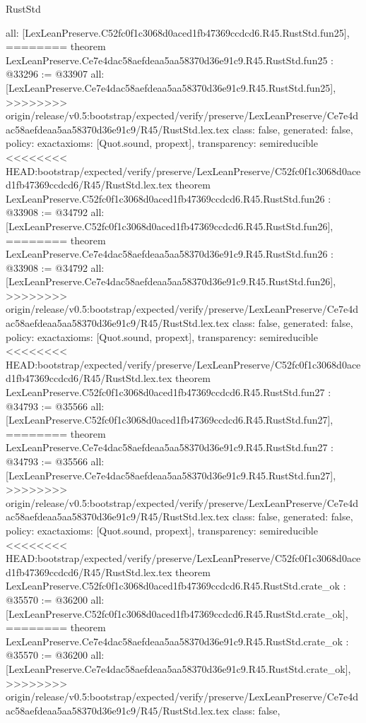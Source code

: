\begin{lexlean}{RustStd}
\begin{coremodule}
{\begin{coremodule}
{{{{{{{{{{{{{{{{{{{{{{{{{{{{  all: [LexLeanPreserve.C52fc0f1c3068d0aced1fb47369ccdcd6.R45.RustStd.fun25],
========
theorem LexLeanPreserve.Ce7e4dac58aefdeaa5aa58370d36e91c9.R45.RustStd.fun25 : @33296 := @33907 {
  all: [LexLeanPreserve.Ce7e4dac58aefdeaa5aa58370d36e91c9.R45.RustStd.fun25],
>>>>>>>> origin/release/v0.5:bootstrap/expected/verify/preserve/LexLeanPreserve/Ce7e4dac58aefdeaa5aa58370d36e91c9/R45/RustStd.lex.tex
  class: false,
  generated: false,
  policy: exact{axioms: [Quot.sound, propext]},
  transparency: semireducible
}
<<<<<<<< HEAD:bootstrap/expected/verify/preserve/LexLeanPreserve/C52fc0f1c3068d0aced1fb47369ccdcd6/R45/RustStd.lex.tex
theorem LexLeanPreserve.C52fc0f1c3068d0aced1fb47369ccdcd6.R45.RustStd.fun26 : @33908 := @34792 {
  all: [LexLeanPreserve.C52fc0f1c3068d0aced1fb47369ccdcd6.R45.RustStd.fun26],
========
theorem LexLeanPreserve.Ce7e4dac58aefdeaa5aa58370d36e91c9.R45.RustStd.fun26 : @33908 := @34792 {
  all: [LexLeanPreserve.Ce7e4dac58aefdeaa5aa58370d36e91c9.R45.RustStd.fun26],
>>>>>>>> origin/release/v0.5:bootstrap/expected/verify/preserve/LexLeanPreserve/Ce7e4dac58aefdeaa5aa58370d36e91c9/R45/RustStd.lex.tex
  class: false,
  generated: false,
  policy: exact{axioms: [Quot.sound, propext]},
  transparency: semireducible
}
<<<<<<<< HEAD:bootstrap/expected/verify/preserve/LexLeanPreserve/C52fc0f1c3068d0aced1fb47369ccdcd6/R45/RustStd.lex.tex
theorem LexLeanPreserve.C52fc0f1c3068d0aced1fb47369ccdcd6.R45.RustStd.fun27 : @34793 := @35566 {
  all: [LexLeanPreserve.C52fc0f1c3068d0aced1fb47369ccdcd6.R45.RustStd.fun27],
========
theorem LexLeanPreserve.Ce7e4dac58aefdeaa5aa58370d36e91c9.R45.RustStd.fun27 : @34793 := @35566 {
  all: [LexLeanPreserve.Ce7e4dac58aefdeaa5aa58370d36e91c9.R45.RustStd.fun27],
>>>>>>>> origin/release/v0.5:bootstrap/expected/verify/preserve/LexLeanPreserve/Ce7e4dac58aefdeaa5aa58370d36e91c9/R45/RustStd.lex.tex
  class: false,
  generated: false,
  policy: exact{axioms: [Quot.sound, propext]},
  transparency: semireducible
}
<<<<<<<< HEAD:bootstrap/expected/verify/preserve/LexLeanPreserve/C52fc0f1c3068d0aced1fb47369ccdcd6/R45/RustStd.lex.tex
theorem LexLeanPreserve.C52fc0f1c3068d0aced1fb47369ccdcd6.R45.RustStd.crate_ok : @35570 := @36200 {
  all: [LexLeanPreserve.C52fc0f1c3068d0aced1fb47369ccdcd6.R45.RustStd.crate_ok],
========
theorem LexLeanPreserve.Ce7e4dac58aefdeaa5aa58370d36e91c9.R45.RustStd.crate_ok : @35570 := @36200 {
  all: [LexLeanPreserve.Ce7e4dac58aefdeaa5aa58370d36e91c9.R45.RustStd.crate_ok],
>>>>>>>> origin/release/v0.5:bootstrap/expected/verify/preserve/LexLeanPreserve/Ce7e4dac58aefdeaa5aa58370d36e91c9/R45/RustStd.lex.tex
  class: false,
}}}}}}}}}}}}}}}}}}}}}}}}}}}}}}}}
\end{coremodule}}
\end{coremodule}
\end{lexlean}
